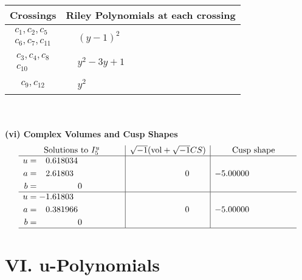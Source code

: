 \documentclass[1p]{elsarticle_modified}
\theoremstyle{definition}
\newcommand{\I}{\sqrt{-1}}
\begin{document}
\begin{tabular}{m{50pt}|m{274pt}}
Crossings & \hspace{64pt}Riley Polynomials at each crossing \\
\hline $$\begin{aligned}c_{1},c_{2},c_{5}\\c_{6},c_{7},c_{11}\end{aligned}$$&$\begin{aligned}
&(y-1)^2
\end{aligned}$\\
\hline $$\begin{aligned}c_{3},c_{4},c_{8}\\c_{10}\end{aligned}$$&$\begin{aligned}
&y^2-3 y+1
\end{aligned}$\\
\hline $$\begin{aligned}c_{9},c_{12}\end{aligned}$$&$\begin{aligned}
&y^2
\end{aligned}$\\
\hline
\end{tabular}\\~\\
\newpage\flushleft \textbf{(vi) Complex Volumes and Cusp Shapes}
$$\begin{array}{c|c|c}  
\text{Solutions to }I^u_{5}& \I (\text{vol} + \sqrt{-1}CS) & \text{Cusp shape}\\
 \hline 
\begin{aligned}
u &= \phantom{-}0.618034\phantom{ +0.000000I} \\
a &= \phantom{-}2.61803\phantom{ +0.000000I} \\
b &= \phantom{-0.000000 } 0\end{aligned}
 & \phantom{-0.000000 } 0 & -5.00000\phantom{ +0.000000I} \\ \hline\begin{aligned}
u &= -1.61803\phantom{ +0.000000I} \\
a &= \phantom{-}0.381966\phantom{ +0.000000I} \\
b &= \phantom{-0.000000 } 0\end{aligned}
 & \phantom{-0.000000 } 0 & -5.00000\phantom{ +0.000000I}\\
 \hline 
 \end{array}$$\newpage
\newpage\renewcommand{\arraystretch}{1}
\centering \section*{ VI. u-Polynomials}
\end{document}
